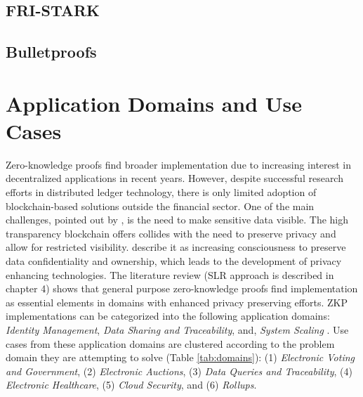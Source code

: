 \subsection{FRI-STARK}

\subsection{Bulletproofs}

\section{Application Domains and Use Cases}
Zero-knowledge proofs find broader implementation due to increasing interest in decentralized applications in recent years. However, despite successful research efforts in distributed ledger technology, there is only limited adoption of blockchain-based solutions outside the financial sector. One of the main challenges, pointed out by \citet{SedlmeirTransparencyChallenge}, is the need to make sensitive data visible. The high transparency blockchain offers collides with the need to preserve privacy and allow for restricted visibility. \citet{Godden} describe it as increasing consciousness to preserve data confidentiality and ownership, which leads to the development of privacy enhancing technologies. The literature review (SLR approach is described in chapter 4) shows that general purpose zero-knowledge proofs find implementation as essential elements in domains with enhanced privacy preserving efforts. ZKP implementations can be categorized into the following application domains: \textit{Identity Management}, \textit{Data Sharing and Traceability}, and, \textit{System Scaling} \citep{PipeZK, chen2022review, morais2019survey}. Use cases from these application domains are clustered according to the problem domain they are attempting to solve (Table \ref{tab:domains}): (1) \textit{Electronic Voting and Government}, (2) \textit{Electronic Auctions}, (3) \textit{Data Queries and Traceability}, (4) \textit{Electronic Healthcare}, (5) \textit{Cloud Security}, and (6) \textit{Rollups}.

